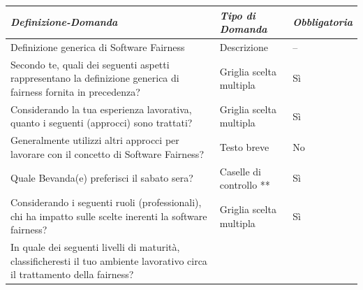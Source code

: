    \begin{longtable}{| p{} | p{} | p{} |} 
        \hline\textbf{\textit{Definizione-Domanda}} & \textbf{\textit{Tipo di Domanda}} & \textbf{\textit{Obbligatoria}}\\
        \hline
        \endhead 
        
        \hline 
         Definizione generica di Software Fairness
        
        & Descrizione
        
        & --
        
        \\ \hline
        \rowcolor{Gray}
        Secondo te, quali dei seguenti aspetti rappresentano la definizione generica di fairness fornita in precedenza?
        
        &  Griglia scelta multipla
        
        & Sì
        
        \\ \hline
        
         Considerando la tua esperienza lavorativa, quanto i seguenti (approcci) sono trattati?
        
        & Griglia scelta multipla
        
        & Sì
        
        \\ \hline
        \rowcolor{Gray}
        Generalmente utilizzi altri approcci per lavorare con il concetto di Software Fairness?        
        
        &  Testo breve
        
        & No
        
        \\ 
        \hline 
         Quale Bevanda(e) preferisci il sabato sera?
        
        & Caselle di controllo **
        
        & Sì
        
        \\ \hline
        
        \rowcolor{Gray}
         Considerando i seguenti ruoli (professionali), chi ha impatto sulle scelte inerenti la software fairness?
        
        & Griglia scelta multipla 
        
        & Sì
        
        \\ \hline
        In quale dei seguenti livelli di maturità, classificheresti il tuo ambiente lavorativo circa il trattamento della fairness?        
        

\end{longtable}
